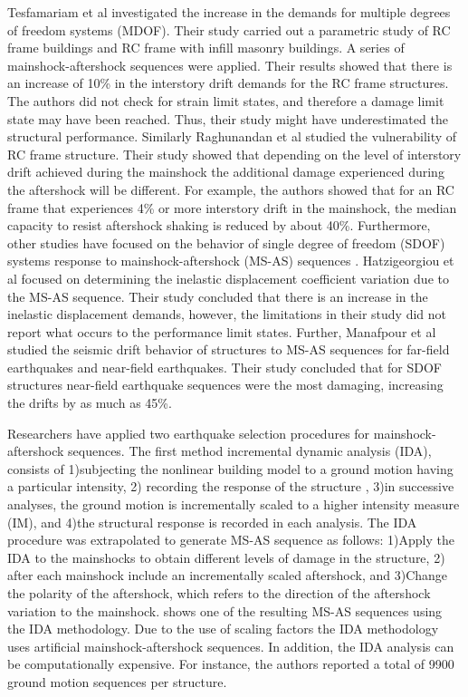 Tesfamariam et al \cite{Tesfamariam2015} investigated the increase in the demands for multiple degrees of freedom systems (MDOF). Their study carried out a parametric study of RC frame buildings and RC frame with infill masonry buildings. A series of mainshock-aftershock sequences were applied. Their results showed that there is an increase of 10\% in the interstory drift demands for the RC frame structures. The authors did not check for strain limit states, and therefore a damage limit state may have been reached. Thus, their study might have underestimated the structural performance. Similarly Raghunandan et al \cite{Raghunandan2015} studied the vulnerability of RC frame structure. Their study showed that depending on the level of interstory drift achieved during the mainshock the additional damage experienced during the aftershock will be different. For example, the authors showed that for an RC frame that experiences 4\% or more interstory drift in the mainshock, the median capacity to resist aftershock shaking is reduced by about 40\%. Furthermore, other studies have focused on the behavior of single degree of freedom (SDOF) systems response to mainshock-aftershock (MS-AS) sequences \cite{Hatzigeorgiou2009}\cite{Manafpour2019}. Hatzigeorgiou et al focused on determining the inelastic displacement coefficient variation due to the MS-AS sequence. Their study concluded that there is an increase in the inelastic displacement demands, however, the limitations in their study did not report what occurs to the performance limit states. Further, Manafpour et al studied the seismic drift behavior of structures to MS-AS sequences for far-field earthquakes and near-field earthquakes. Their study concluded that for SDOF structures near-field earthquake sequences were the most damaging, increasing the drifts by as much as 45\%.

Researchers have applied two earthquake selection procedures for mainshock-aftershock sequences. The first method incremental dynamic analysis (IDA), consists of 1)subjecting the nonlinear building model to a ground motion having a particular intensity, 2) recording the response of the structure \cite{Vamvatsikos2002}, 3)in successive analyses, the ground motion is incrementally scaled to a higher intensity measure (IM), and 4)the structural response is recorded in each analysis. The IDA procedure was extrapolated to generate MS-AS sequence as follows: 1)Apply the IDA to the mainshocks to obtain different levels of damage in the structure, 2) after each mainshock include an incrementally scaled aftershock, and 3)Change the polarity of the aftershock, which refers to the direction of the aftershock variation to the mainshock.  shows one of the resulting MS-AS sequences using the IDA methodology. Due to the use of scaling factors the IDA methodology uses artificial mainshock-aftershock sequences. In addition, the IDA analysis can be computationally expensive. For instance, the authors reported a total of 9900 ground motion sequences per structure.

